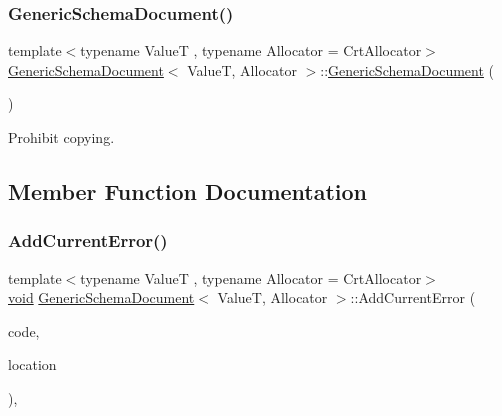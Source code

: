 \subsubsection{\texorpdfstring{Generic\+Schema\+Document()}{GenericSchemaDocument()}\hspace{0.1cm}{\footnotesize\ttfamily [2/2]}}
{\footnotesize\ttfamily template$<$typename ValueT , typename Allocator  = Crt\+Allocator$>$ \\
\hyperlink{classGenericSchemaDocument}{Generic\+Schema\+Document}$<$ ValueT, Allocator $>$\+::\hyperlink{classGenericSchemaDocument}{Generic\+Schema\+Document} (\begin{DoxyParamCaption}\item[{const \hyperlink{classGenericSchemaDocument}{Generic\+Schema\+Document}$<$ ValueT, Allocator $>$ \&}]{ }\end{DoxyParamCaption})\hspace{0.3cm}{\ttfamily [private]}}



Prohibit copying. 



\subsection{Member Function Documentation}
\mbox{\label{classGenericSchemaDocument_ad2d783f0d0ec9944d06d01788c5bbee6}} 
\subsubsection{\texorpdfstring{Add\+Current\+Error()}{AddCurrentError()}}
{\footnotesize\ttfamily template$<$typename ValueT , typename Allocator  = Crt\+Allocator$>$ \\
\hyperlink{imgui__impl__opengl3__loader_8h_ac668e7cffd9e2e9cfee428b9b2f34fa7}{void} \hyperlink{classGenericSchemaDocument}{Generic\+Schema\+Document}$<$ ValueT, Allocator $>$\+::Add\+Current\+Error (\begin{DoxyParamCaption}\item[{const \hyperlink{group__RAPIDJSON__ERRORS_ga64f496d2cee8c9673f3105ec6008f290}{Schema\+Error\+Code}}]{code,  }\item[{const \hyperlink{classGenericSchemaDocument_aeb62f562d4dc024402b00f97cbcef747}{Pointer\+Type} \&}]{location }\end{DoxyParamCaption})\hspace{0.3cm}{\ttfamily [inline]}, {\ttfamily [private]}}

